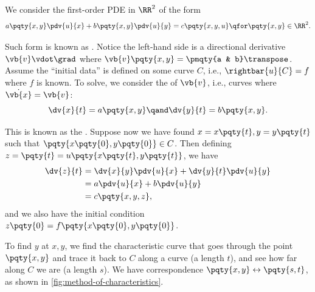 We consider the first-order PDE in \(\RR^2\) of the form
\begin{equation}
    a\pqty{x, y} \pdv{u}{x} + b\pqty{x, y} \pdv{u}{y} = c\pqty{x, y, u} \qfor \pqty{x, y} \in \RR^2.
\end{equation}

Such form is known as . Notice the left-hand side is a directional derivative \(\vb{v} \vdot \grad\) where \(\vb{v}\pqty{x, y} = \pmqty{a & b}\transpose\). Assume the ``initial data'' is defined on some curve \(C\), i.e., \(\rightbar{u}{C} = f\) where \(f\) is known. To solve, we consider the  of \(\vb{v}\), i.e., curves where \(\dot{\vb{x}} = \vb{v}\):
\begin{equation}
    \dv{x}{t} = a\pqty{x, y} \qand \dv{y}{t} = b\pqty{x, y}.
\end{equation}

This is known as the . Suppose now we have found \(x = x\pqty{t}, y = y\pqty{t}\) such that \(\pqty{x\pqty{0}, y\pqty{0}} \in C\). Then defining \(z = \pqty{t} = u\pqty{x\pqty{t}, y\pqty{t}}\), we have
\begin{subequations}
    \begin{align}
        \dv{z}{t} &= \dv{x}{y} \pdv{u}{x} + \dv{y}{t} \pdv{u}{y} \\
        &= a\pdv{u}{x} + b\pdv{u}{y} \\
        &= c\pqty{x, y, z},
    \end{align}
\end{subequations}
and we also have the initial condition \(z\pqty{0} = f\pqty{x\pqty{0}, y\pqty{0}}\).

To find \(y\) at \(x, y\), we find the characteristic curve that goes through the point \(\pqty{x, y}\) and trace it back to \(C\) along a curve (a length \(t\)), and see how far along \(C\) we are (a length \(s\)). We have correspondence \(\pqty{x, y} \leftrightarrow \pqty{s, t}\), as shown in \autoref{fig:method-of-characteristics}.

